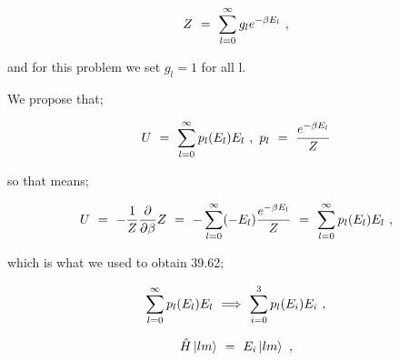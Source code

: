 \documentclass{article}
\begin{document}
\begin{equation} \label{eq:276}
Z \hspace{0.125cm} = \hspace{0.125cm} \sum_{l=0}^{\infty} g_{l} e^{-\beta E_{l}} \hspace{0.125cm} , 
\end{equation} 

and for this problem we set \begin{math} g_{l} = 1 \end{math} for all l.

We propose that;

\begin{equation} \label{eq:277}
U \hspace{0.125cm} = \hspace{0.125cm} \sum_{l=0}^{\infty} p_{l}(E_{l}) E_{l} \hspace{0.125cm} , \hspace{0.125cm} p_{l} \hspace{0.125cm} = \hspace{0.125cm} \frac{e^{-\beta E_{l}}}{Z}
\end{equation} 

so that means;

\begin{equation} \label{eq:278}
U \hspace{0.125cm} = \hspace{0.125cm} -\frac{1}{Z}\frac{\partial}{\partial{\beta}} Z \hspace{0.125cm} = \hspace{0.125cm} - \sum_{l=0}^{\infty} (-E_{l}) \frac{e^{-\beta E_{l}}}{Z}  \hspace{0.125cm} = \hspace{0.125cm} \sum_{l=0}^{\infty} p_{l}(E_{l}) E_{l} \hspace{0.125cm}, 
\end{equation} 


which is what we used to obtain 39.62;
 
\begin{equation} \label{eq:279}
\sum_{l=0}^{\infty} p_{l}(E_{l}) E_{l} \hspace{0.125cm} \Longrightarrow \hspace{0.125cm} \sum_{i=0}^{3} p_{l}(E_{i}) E_{i} \hspace{0.125cm} ,
\end{equation}

\begin{equation} \label{eq:280}
\hat{H} \ket{l m} \hspace{0.125cm} = \hspace{0.125cm} E_{i} \ket{l m} \hspace{0.125cm} ,
\end{equation}
\end{document}
